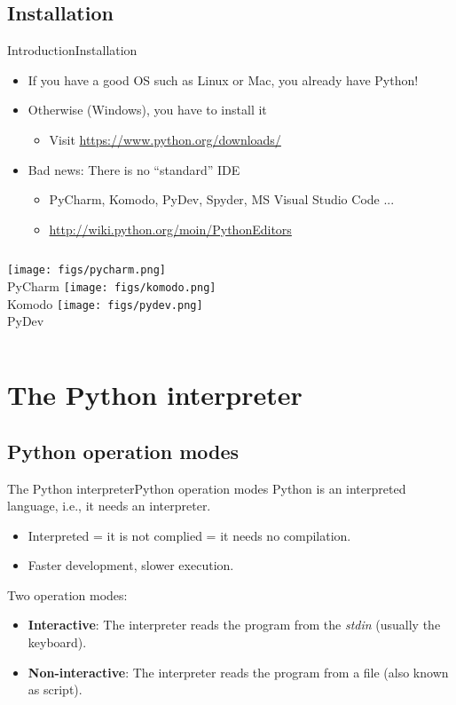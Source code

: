 \documentclass[10pt,compress]{beamer} %
\begin{document}
\subsection{Installation}
\begin{frame}{Introduction}{Installation}
\vspace{-0,3cm}
	\begin{itemize}
		\item If you have a good OS such as Linux or Mac, you already have Python!
		\item Otherwise (Windows), you have to install it
			\begin{itemize}
			\item Visit \url{https://www.python.org/downloads/}
			\end{itemize}
		\item Bad news: There is no ``standard'' IDE
			\begin{itemize}
			\item PyCharm, Komodo, PyDev, Spyder, MS Visual Studio Code ...
			\item \url{http://wiki.python.org/moin/PythonEditors}
			\end{itemize}
	\end{itemize}
    \begin{columns}
		\texttt{[image: figs/pycharm.png]}\\\centering PyCharm
		\texttt{[image: figs/komodo.png]}\\\centering Komodo
		\texttt{[image: figs/pydev.png]}\\\centering PyDev
	\end{columns}
\end{frame}


\section{The Python interpreter}

\subsection{Python operation modes}
\begin{frame}{The Python interpreter}{Python operation modes}
		Python is an interpreted language, i.e., it needs an interpreter.
			\begin{itemize}
				\item Interpreted = it is not complied = it needs no compilation.
				\item Faster development, slower execution.
			\end{itemize}
		Two operation modes:
			\begin{itemize}
				\item \textbf{Interactive}: The interpreter reads the program from the \textit{stdin} (usually the keyboard).
				\item \textbf{Non-interactive}: The interpreter reads the program from a file (also known as \alert{script}).
			\end{itemize}
\end{frame}
\end{document}

